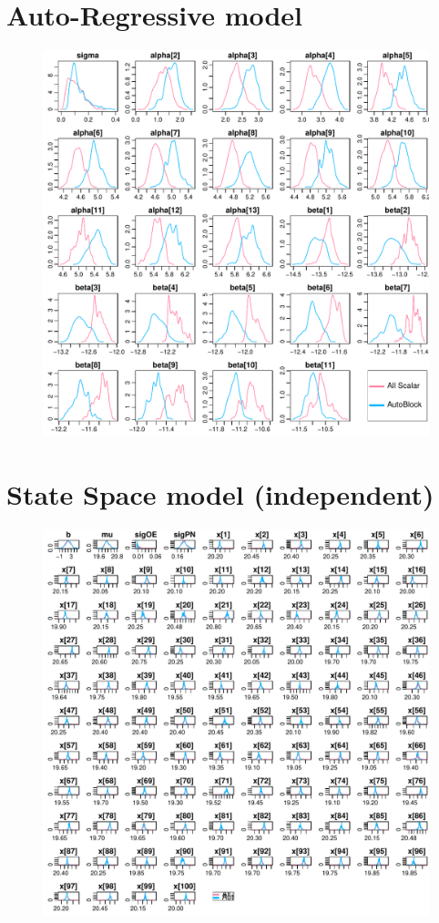 \documentclass{article}
\begin{document}
\section{Auto-Regressive model}
\begin{figure}[h]
\centerline{\includegraphics[scale=1.0]{AutoRegressivemodel}}
\end{figure}
\thispagestyle{empty}
\clearpage

\section{State Space model (independent)}
\begin{figure}[h]
\centerline{\includegraphics[scale=1.0]{StateSpacemodelindependent}}
\end{figure}
\thispagestyle{empty}
\clearpage
\end{document}
